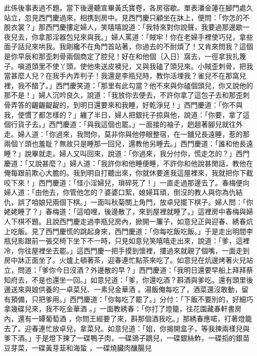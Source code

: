 \begin{showcontents}{}
此係後事表過不題。當下後邊聽宣畢黃氏寶卷，各房宿歇。單表潘金蓮在腳門處久站立，忽見西門慶過來，相携到房中。見西門慶只顧坐在牀上，便問：「你怎的不脫衣裳？」那西門慶摟定婦人，笑嘻嘻說道：「我特來對你說聲，我要過那邊歇一夜兒去，你拿那淫器包兒來與我。」婦人罵道：「賊牢！你在老婦手裡使巧兒，拿些面子話兒來哄我。我剛纔不在角門首站著，你過去的不耐煩了！又肯來問我？這個是你早辰和那歪刺骨兩個商定了腔兒！好在和他個｛入日｝窩去，一徑拿我扎篾子。嗔道頭里不使丫頭，使他來送皮襖兒，又與我磕了頭兒來。小賊歪刺骨，把我當甚麼人兒？在我手內弄判子！我還是李瓶兒時，教你活埋我？雀兒不在那窩兒裡，我不醋了。」西門慶笑道：「那里有此勾當？他不來與你磕個頭兒，你又說他的那不是！」婦人沉吟良久，說道：「我放你去便去，不許你拿了這包子去和那歪刺骨弄答的齷齷齪齪的，到明日還要來和我睡，好乾淨兒！」西門慶道：「你不與我，使慣了都怎樣的？」纏了半日，婦人把銀托子掠與他，說道：「你要，拿了這個行貨子去。」西門慶道：「與我這個也罷。」一面接的袖子，趔趄著腳兒就往外走。婦人道：「你過來，我問你，莫非你與他停眼整宿，在一舖兒長遠睡，惹的那兩個丫頭也羞耻？無故只是睡那一回兒，還教他另睡去。」西門慶道：「誰和他長遠睡？」說畢就走。婦人又叫回來，說道：「你過來，我分付你，慌走怎的？」西門慶道：「又說甚麼？」婦人道：「我許你和他睡便睡，不許你和他說甚閒話，教他在俺每跟前欺心大膽的。我到明自打聽出來，你就休要進我這屋裡來，我就把你下截咬下來！」西門慶道：「怪小淫婦兒，瑣碎死了！」一直走過那邊去了。春梅便向婦人道：「由他去，你管他怎的？婆婆口絮，媳婦耳頑，倒沒的教人與你為仇結仇，誤了咱娘兒兩個下棋。」一面叫秋菊關上角門，放卓兒擺下棋子。婦人問：「你姥姥睡了？」春梅道：「這咱哩，後邊散了，來到屋裡就睡了。」這裡房中春梅與婦人下棋不題。且說西門慶走過李瓶兒房內，掀開一簾子，如意兒正與迎春、綉春炕上吃飯。見了西門慶慌的跳起身來，西門慶道：「你每吃飯吃飯。」于是走出明間李瓶兒影跟前一張交椅下坐下不一時，只見如意兒笑嘻嘻走出來，說道：「爹，這裡冷，你往屋裡坐去罷。」這西門慶一把手摸到懷裡，摟過來就親了個嘴，一面走到房中牀正面坐了。火爐上頓著茶，迎春連忙點茶來吃了。如意兒在炕邊烤著火兒站立，問道：「爹你今日沒酒？外邊散的早？」西門慶道：「我明日還要早船上拜拜蔡知府去，不是也還坐一回。」如意兒道：「爹，你還吃酒？斟酒與爹吃。還有頭里後邊送來與娘供養的一卓菜兒、一素兒金華酒 。湯飯俺每吃了，酒菜還沒敢動，留有預備，只把爹用。」西門慶道：「你每吃了罷了。」分付：「下飯不要別的，好細巧拿幾碟兒來，我不吃金華酒 。」一面教綉春：「你打了燈籠，往花園藏春軒書房內，還有一罈葡萄酒 ，你問王經要了來，斟那個酒我吃。」那綉春應喏，打著燈籠去了。迎春連忙放卓兒，拿菜兒。如意兒道：「姐，你揭開盒子，等我揀兩樣兒與爹下酒。」于是燈下揀了一碟鴨子肉，一碟鴿子鶵兒，一碟銀絲鮓，一碟搯的銀苗豆芽菜，一碟黃芽韮和海蜇 ，一碟燒臟肉釀腸兒 
\end{showcontents}
